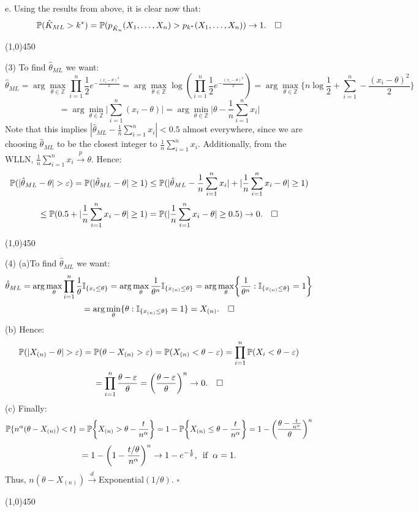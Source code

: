 \documentclass[12pt]{article}
\begin{document}
\noindent
e. Using the results from above, it is clear now that:
$$\mathbb{P}(\hat{K}_{ML} > k^*) = \mathbb{P}(p_{\hat{K}_n}(X_1,\dots,X_n) > p_{k^*}(X_1,\dots,X_n)) \to 1. \hspace{10 pt} \square $$
\begin{center}
\line(1,0){450}
\end{center}

\pagebreak
\noindent
(3) To find $\hat\theta_{ML}$ we want:
$$\hat\theta_{ML} = \arg\max_{\theta\in\mathbb{Z}}\prod\limits_{i=1}^n \frac{1}{2}e^{-\frac{(x_i-\theta)^2}{2}}
= \arg\max_{\theta\in\mathbb{Z}} \log (\prod\limits_{i=1}^n \frac{1}{2}e^{-\frac{(x_i-\theta)^2}{2}})
= \arg\max_{\theta\in\mathbb{Z}} \biggl\{ n\log \frac{1}{2} + \sum\limits_{i=1}^n -\frac{(x_i-\theta)^2}{2} \biggr\}$$
$$= \arg\min_{\theta\in\mathbb{Z}} \biggl| \sum\limits_{i=1}^n (x_i-\theta) \biggr|
= \arg\min_{\theta\in\mathbb{Z}} \biggl| \theta-\frac{1}{n}\sum\limits_{i=1}^n x_i \biggr|$$
Note that this implies $|\hat\theta_{ML}-\frac{1}{n}\sum_{i=1}^n x_i| < 0.5$ almost everywhere, since we are choosing $\hat\theta_{ML}$ to be the closest integer to $\frac{1}{n}\sum_{i=1}^n x_i$. Additionally, from the WLLN, $\frac{1}{n}\sum_{i=1}^n x_i \overset{p}\to \theta$.
Hence:
$$\prob(|\hat\theta_{ML}-\theta|>\varepsilon) = \prob(|\hat\theta_{ML}-\theta|\geq 1)
\leq  \prob(|\hat\theta_{ML}-\frac{1}{n}\sum_{i=1}^n x_i|+|\frac{1}{n}\sum_{i=1}^n x_i-\theta|\geq 1)$$
$$\leq  \mathbb{P}(0.5+|\frac{1}{n}\sum_{i=1}^n x_i-\theta|\geq 1)
= \mathbb{P}(|\frac{1}{n}\sum_{i=1}^n x_i-\theta|\geq 0.5) \to 0. \hspace{10 pt} \square $$

\begin{center}
\line(1,0){450}
\end{center}

\noindent
(4) (a)To find $\hat\theta_{ML}$ we want:
$$\hat\theta_{ML} = \arg\max_{\theta}\prod\limits_{i=1}^n \frac{1}{\theta}\mathbb{I}_{\{x_i \leq \theta\}}
= \arg\max_{\theta} \frac{1}{\theta^n}\mathbb{I}_{\{x_{(n)} \leq \theta\}}
= \arg\max_{\theta} \biggl\{ \frac{1}{\theta^n} : \mathbb{I}_{\{x_{(n)} \leq \theta\}}=1\biggr\}$$
$$= \arg\min_{\theta} \{ \theta : \mathbb{I}_{\{x_{(n)} \leq \theta\}}=1\} = X_{(n)}. \hspace{10 pt} \square$$
(b) Hence:
$$\prob(|X_{(n)}-\theta|>\varepsilon) = \prob(\theta-X_{(n)} > \varepsilon)
= \prob(X_{(n)} < \theta-\varepsilon)
= \prod\limits_{i=1}^n \prob(X_i < \theta - \varepsilon)$$
$$= \prod\limits_{i=1}^n \frac{\theta-\varepsilon}{\theta}
= \biggl(\frac{\theta-\varepsilon}{\theta}\biggr)^n \to 0. \hspace{10 pt} \square $$
(c) Finally:
$$ \mathbb{P}\{n^{\alpha}(\theta-X_{(n)}) < t\} = \mathbb{P}\biggl\{X_{(n)}>\theta-\frac{t}{n^\alpha}\biggr\}
= 1- \mathbb{P}\biggl\{X_{(n)} \leq \theta-\frac{t}{n^\alpha}\biggr\}
= 1- \biggl(\frac{\theta-\frac{t}{n^\alpha}}{\theta}\biggr)^n$$
$$= 1- \biggl(1-\frac{t/\theta}{n^\alpha }\biggr)^n
\to 1-e^{-\frac{t}{\theta}}, \hspace{5 pt} {\rm if} \hspace{5 pt} \alpha = 1. $$
Thus, $n(\theta-X_{(n)}) \overset{d}\to $Exponential$(1/\theta)$. $\square$
\begin{center}
\line(1,0){450}
\end{center}
\end{document}

